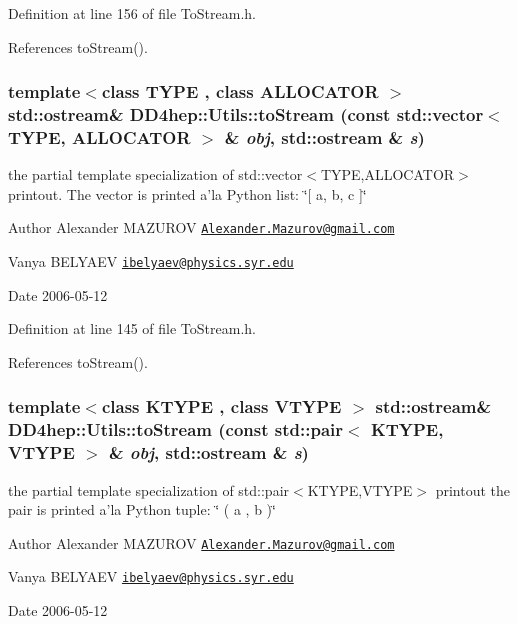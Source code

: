 Definition at line 156 of file ToStream.h.

References toStream().\hypertarget{namespace_d_d4hep_1_1_utils_a630d3fee3bf5700b7a13b93ae0749a51}{
\subsubsection[{toStream}]{\setlength{\rightskip}{0pt plus 5cm}template$<$class TYPE , class ALLOCATOR $>$ std::ostream\& DD4hep::Utils::toStream (const std::vector$<$ TYPE, ALLOCATOR $>$ \& {\em obj}, \/  std::ostream \& {\em s})}}
\label{namespace_d_d4hep_1_1_utils_a630d3fee3bf5700b7a13b93ae0749a51}
the partial template specialization of {\ttfamily std::vector$<$TYPE,ALLOCATOR$>$} printout. The vector is printed a'la Python list: \char`\"{}\mbox{[} a, b, c \mbox{]}\char`\"{} \begin{DoxyAuthor}{Author}
Alexander MAZUROV \href{mailto:Alexander.Mazurov@gmail.com}{\tt Alexander.Mazurov@gmail.com} 

Vanya BELYAEV \href{mailto:ibelyaev@physics.syr.edu}{\tt ibelyaev@physics.syr.edu} 
\end{DoxyAuthor}
\begin{DoxyDate}{Date}
2006-\/05-\/12 
\end{DoxyDate}


Definition at line 145 of file ToStream.h.

References toStream().\hypertarget{namespace_d_d4hep_1_1_utils_aa662bd0ad73f64bb42253a7b5023c8a6}{
\subsubsection[{toStream}]{\setlength{\rightskip}{0pt plus 5cm}template$<$class KTYPE , class VTYPE $>$ std::ostream\& DD4hep::Utils::toStream (const std::pair$<$ KTYPE, VTYPE $>$ \& {\em obj}, \/  std::ostream \& {\em s})}}
\label{namespace_d_d4hep_1_1_utils_aa662bd0ad73f64bb42253a7b5023c8a6}
the partial template specialization of {\ttfamily std::pair$<$KTYPE,VTYPE$>$} printout the pair is printed a'la Python tuple: \char`\"{} ( a , b )\char`\"{} \begin{DoxyAuthor}{Author}
Alexander MAZUROV \href{mailto:Alexander.Mazurov@gmail.com}{\tt Alexander.Mazurov@gmail.com} 

Vanya BELYAEV \href{mailto:ibelyaev@physics.syr.edu}{\tt ibelyaev@physics.syr.edu} 
\end{DoxyAuthor}
\begin{DoxyDate}{Date}
2006-\/05-\/12 
\end{DoxyDate}


